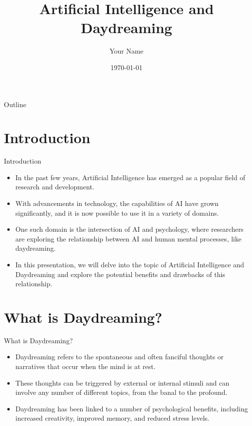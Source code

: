 \documentclass{beamer}
\title[AI and Daydreaming]{Artificial Intelligence and Daydreaming}
\author[Your Name]{Your Name}
\institute[Your University]{Your University}
\date{\today}
\begin{document}
\begin{frame}
\titlepage
\end{frame}

\begin{frame}{Outline}
\begin{multicols}{2}
\tableofcontents
\end{multicols}
\end{frame}

\section{Introduction}

\begin{frame}{Introduction}
\begin{itemize}
    \item In the past few years, Artificial Intelligence has emerged as a popular field of research and development.
    \item With advancements in technology, the capabilities of AI have grown significantly, and it is now possible to use it in a variety of domains.
    \item One such domain is the intersection of AI and psychology, where researchers are exploring the relationship between AI and human mental processes, like daydreaming.
    \item In this presentation, we will delve into the topic of Artificial Intelligence and Daydreaming and explore the potential benefits and drawbacks of this relationship.
\end{itemize}
\end{frame}

\section{What is Daydreaming?}

\begin{frame}{What is Daydreaming?}
\begin{itemize}
    \item Daydreaming refers to the spontaneous and often fanciful thoughts or narratives that occur when the mind is at rest.
    \item These thoughts can be triggered by external or internal stimuli and can involve any number of different topics, from the banal to the profound.
    \item Daydreaming has been linked to a number of psychological benefits, including increased creativity, improved memory, and reduced stress levels.
\end{itemize}
\end{frame}
\end{document}
